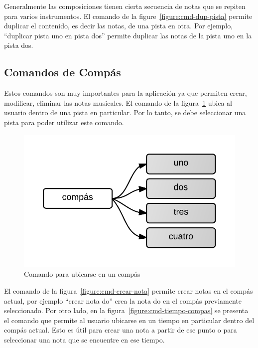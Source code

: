 Generalmente las composiciones tienen cierta secuencia de notas que se repiten para varios instrumentos. El comando de la 
figure~\ref{figure:cmd-dup-pista} permite duplicar el contenido, es decir las notas, de una pista en otra. Por ejemplo, 
``duplicar pista uno en pista dos'' permite duplicar las notas de la pista uno en la pista dos.

\subsection{Comandos de Comp\'as}

Estos comandos son muy importantes para la aplicaci\'on ya que permiten crear, modificar, 
eliminar las notas musicales. El comando de la figura~\ref{figure:cmd-compas} ubica al usuario dentro de una pista en particular. 
Por lo tanto, se debe seleccionar una pista para poder utilizar este comando.

\begin{figure}[H] 
\centering
\includegraphics[width=0.4\linewidth]{./graphics/cmd-compas.png}
\caption{Comando para ubicarse en un comp\'as}
\label{figure:cmd-compas}
\quad
\end{figure}

El comando de la figura~\ref{figure:cmd-crear-nota} permite crear notas en el  
comp\'as actual, por ejemplo ``crear nota do'' crea la nota do en el comp\'as previamente seleccionado. Por otro lado, en la figura~\ref{figure:cmd-tiempo-compas} se presenta el comando que permite al usuario ubicarse en un  
tiempo en particular dentro del comp\'as actual. Esto es \'util para crear una nota a partir de ese punto o 
para seleccionar una nota que se encuentre en ese tiempo.

